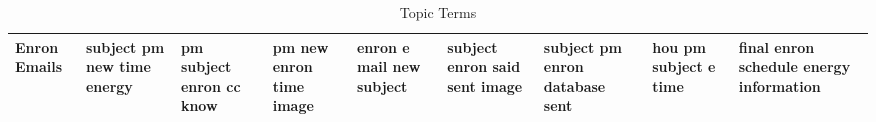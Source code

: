 \documentclass[11pt,a4paper]{article}
\begin{document}
\begin{appendices}
\begin{table*}[htp]
\begin{tiny}
\begin{tabular}{|p{}|p{}|p{}|p{}|p{}|p{}|p{}|p{}|p{}|}
Enron Emails & subject \newline pm \newline new \newline time \newline energy & pm \newline subject \newline enron \newline cc \newline know & pm \newline new \newline enron \newline time \newline image & enron \newline e \newline mail \newline new \newline subject & subject \newline enron \newline said \newline sent \newline image & subject \newline pm \newline enron \newline database \newline sent & hou \newline pm \newline subject \newline e \newline time & final \newline enron \newline schedule \newline energy \newline information\\\hline
\end{tabular}
\end{tiny}
\caption{Topic Terms}
\end{table*}


\end{appendices}
\end{document}
